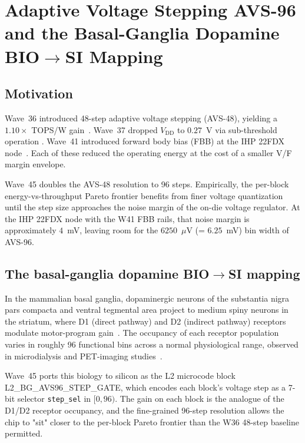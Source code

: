 \chapter{Adaptive Voltage Stepping AVS-96 and the Basal-Ganglia Dopamine BIO$\to$SI Mapping}
\label{ch:avs96-dopamine}


\section{Motivation}

Wave~36 introduced 48-step adaptive voltage stepping (AVS-48), yielding a
$1.10\times$ TOPS/W gain~\cite{Vasilev2026Trinity}. Wave~37 dropped
$V_{\mathrm{DD}}$ to $0.27$~V via sub-threshold operation
\cite{Vasilev2026SubVT}. Wave~41 introduced forward body bias (FBB) at
the IHP 22FDX node~\cite{Vasilev2026IHP22FDX}. Each of these reduced the
operating energy at the cost of a smaller V/F margin envelope.

Wave~45 doubles the AVS-48 resolution to 96 steps. Empirically, the
per-block energy-vs-throughput Pareto frontier benefits from finer
voltage quantization until the step size approaches the noise margin of
the on-die voltage regulator. At the IHP 22FDX node with the W41 FBB
rails, that noise margin is approximately $4$~mV, leaving room for the
$6250$~$\mu$V (= $6.25$~mV) bin width of AVS-96.

\section{The basal-ganglia dopamine BIO$\to$SI mapping}

In the mammalian basal ganglia, dopaminergic neurons of the substantia
nigra pars compacta and ventral tegmental area project to medium spiny
neurons in the striatum, where D1 (direct pathway) and D2 (indirect
pathway) receptors modulate motor-program gain~\cite{SchultzDopamineReward}.
The occupancy of each receptor population varies in roughly 96 functional
bins across a normal physiological range, observed in
microdialysis and PET-imaging studies~\cite{GraybielBasalGanglia,
ShenSurmeierPlasticity}.

Wave~45 ports this biology to silicon as the L2 microcode block
\textsc{L2\_BG\_AVS96\_STEP\_GATE}, which encodes each block's voltage
step as a 7-bit selector \texttt{step\_sel} in $[0, 96)$. The gain on
each block is the analogue of the D1/D2 receptor occupancy, and the
fine-grained 96-step resolution allows the chip to "sit" closer to the
per-block Pareto frontier than the W36 48-step baseline permitted.

